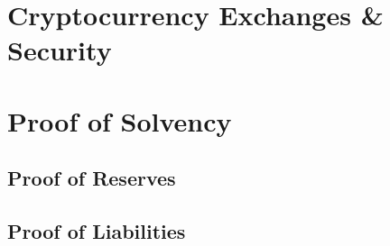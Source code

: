 \section{Cryptocurrency Exchanges \& Security}



\section{Proof of Solvency}

\subsection{Proof of Reserves}
\subsection{Proof of Liabilities}





